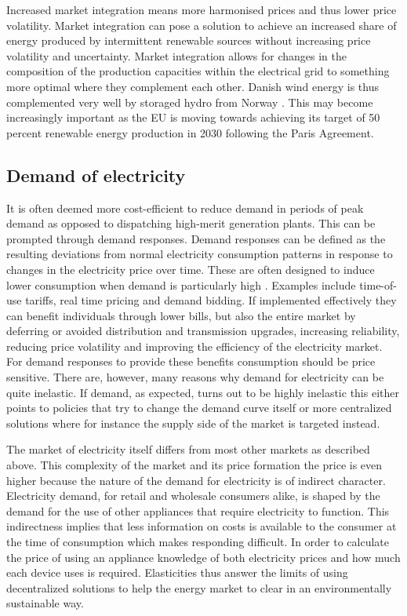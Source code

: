 Increased market integration means more harmonised prices and thus lower price volatility. Market integration can pose a solution to achieve an increased share of energy produced by intermittent renewable sources without increasing price volatility and uncertainty. Market integration allows for changes in the composition of the production capacities within the electrical grid to something more optimal where they complement each other. Danish wind energy is thus complemented very well by storaged hydro from Norway \citep{ambec2012electricity}.  This may become increasingly important as the EU is moving towards achieving its target of 50 percent renewable energy production in 2030 following the Paris Agreement.

\subsection{Demand of electricity}
\label{subsec:t_demand}
It is often deemed more cost-efficient to reduce demand in periods of peak demand as opposed to dispatching high-merit generation plants. This can be prompted through demand responses. Demand responses can be defined as the resulting deviations from normal electricity consumption patterns in response to changes in the electricity price over time. These are often designed to induce lower consumption when demand is particularly high \citep{albadi2008summary}. Examples include time-of-use tariffs, real time pricing and demand bidding. If implemented effectively they can benefit individuals through lower bills, but also the entire market by deferring or avoided distribution and transmission upgrades, increasing reliability, reducing price volatility and improving the efficiency of the electricity market. For demand responses to provide these benefits consumption should be price sensitive. There are, however, many reasons why demand for electricity can be quite inelastic. If demand, as expected, turns out to be highly inelastic this either points to policies that try to change the demand curve itself or more centralized solutions where for instance the supply side of the market is targeted instead.
\medskip

The market of electricity itself differs from most other markets as described above. This complexity of the market and its price formation the price is even higher because the nature of the demand for electricity is of indirect character. Electricity demand, for retail and wholesale consumers alike, is shaped by the demand for the use of other appliances that require electricity to function.
This indirectness implies that less information on costs is available to the consumer at the time of consumption which makes responding difficult. In order to calculate the price of using an appliance knowledge of both electricity prices and how much each device uses is required. Elasticities thus answer the limits of using decentralized solutions to help the energy market to clear in an environmentally sustainable way. 
\medskip

